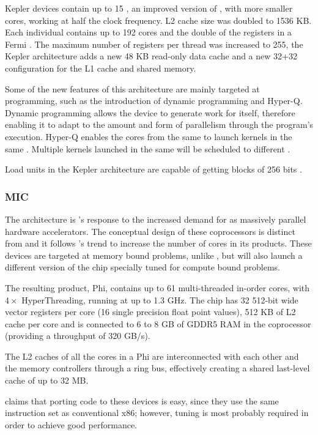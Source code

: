 Kepler devices contain up to 15 \smx, an improved version of \sm, with more smaller cores, working at half the clock frequency. L2 cache size was doubled to 1536 KB. Each individual \smx contains up to 192 cores and the double of the registers in a Fermi \sm. The maximum number of registers per thread was increased to 255, the Kepler architecture adds a new 48 KB read-only data cache and a new 32+32 configuration for the L1 cache and shared memory.

Some of the new features of this architecture are mainly targeted at programming, such as the introduction of dynamic programming and Hyper-Q. Dynamic programming allows the device to generate work for itself, therefore enabling it to adapt to the amount and form of parallelism through the program's execution. Hyper-Q enables the cores from the same \cpu to launch kernels in the same \gpu. Multiple kernels launched in the same \gpu will be scheduled to different \smx.

Load units in the Kepler architecture are capable of getting blocks of 256 bits \cite{NVIDIA:KEPLER}.


\subsubsection{\acf{MIC}}
The \mic architecture \cite{Intel:XeonPhi:DevGuide} is \intel's response to the increased demand for \gpgpus as massively parallel hardware accelerators. The conceptual design of these coprocessors is distinct from \gpgpus and it follows \intel's trend to increase the number of cores in its products. These devices are targeted at memory bound problems, unlike \gpus, but \intel will also launch a different version of the chip specially tuned for compute bound problems.

The resulting product, \intel\xeon Phi, contains up to 61 multi-threaded in-order cores, with $4\times$ HyperThreading, running at up to 1.3 GHz. The chip has 32 512-bit wide vector registers per core (16 single precision float point values), 512 KB of L2 cache per core and is connected to 6 to 8 GB of GDDR5 RAM in the coprocessor (providing a throughput of 320 GB/s).

The L2 caches of all the cores in a \xeon Phi are interconnected with each other and the memory controllers through a ring bus, effectively creating a shared last-level cache of up to 32 MB.

\intel claims that porting \cpu code to these devices is easy, since they use the same instruction set as conventional x86; however, tuning is most probably required in order to achieve good performance.




